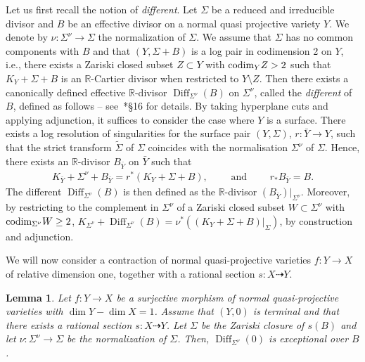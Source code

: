 \documentclass[11pt]{ip-journal}
\newtheorem{lemma}[theorem]{Lemma}
\theoremstyle{definition}
\DeclareMathOperator{\diff}{\mathrm{Diff}}
\newcommand{\bR}{\mathbb{R}}
\begin{document}
Let us first recall the notion of {\it different}.
Let $\Sigma$ be a reduced and irreducible divisor and $B$ be an effective divisor on a normal quasi projective variety $Y$.
We denote by $\nu \colon \Sigma^\nu \to \Sigma$ the normalization of $\Sigma$.
We assume that $\Sigma$ has no common components with $B$ and that $(Y, \Sigma+B)$ is a log pair in codimension 2 on $Y$, i.e., there exists a Zariski closed subset $Z \subset Y$ with ${\rm codim}_Y Z >2$ such that $K_Y+\Sigma+B$ is an $\mathbb R$-Cartier divisor when restricted to $Y \setminus Z$.
Then there exists a canonically defined effective $\mathbb{R}$-divisor $\diff_{\Sigma^\nu}(B)$ on $\Sigma^\nu$, called the \textit{different} of $B$, defined as follows -- see~\cite{MR1225842}*{\S 16} for details.
By taking hyperplane cuts and applying adjunction, it suffices to consider the case where $Y$ is a surface.
There exists a log resolution of singularities for the surface pair $(Y, \Sigma)$, $r \colon \bar{Y} \to Y$, such that the strict transform $\tilde{\Sigma}$ of $\Sigma$ coincides with the normalisation $\Sigma^\nu$ of $\Sigma$.
Hence, there exists an $\bR$-divisor $B_{\bar{Y}}$ on $\bar{Y}$ such that 
\begin{align*}
K_{\bar{Y}}+\Sigma^\nu+ B_{\bar{Y}} = r^\ast(K_Y+\Sigma+B), 
\qquad
\text{ and } 
\qquad
r_\ast B_{\bar{Y}} =B. 
\end{align*}
The different $\diff_{\Sigma^\nu}(B)$ is then defined as the $\bR$-divisor $(B_{\bar{Y}}) |_{\Sigma^\nu}$.
Moreover, by restricting to the complement in $\Sigma^{\nu}$ of a Zariski closed subset $W \subset \Sigma^\nu$ with ${\rm codim}_{\Sigma^\nu} W \geq 2$, 
$K_{\Sigma^\nu}+\diff_{\Sigma^\nu}(B)=\nu^*((K_Y+\Sigma+B) |_\Sigma)$, by construction and adjunction.

We will now consider a contraction of normal quasi-projective varieties 
$f \colon Y \to X$ 
of relative dimension one, together with a rational section 
$s \colon X \dashrightarrow Y$.

\begin{lemma}\label{section.lemma}
Let 
$f \colon Y \to X$ 
be a surjective morphism of normal quasi-projective varieties with 
$\dim Y -\dim X=1$.
Assume that 
$(Y, 0)$ 
is terminal and that there exists a rational section 
$s \colon X \dashrightarrow Y$.
Let 
$\Sigma$ 
be the Zariski closure of 
$s(B)$ 
and let 
$\nu\colon \Sigma^\nu \to \Sigma$ 
be the normalization of 
$\Sigma$. 
Then, 
$\diff_{\Sigma^\nu}(0)$ 
is exceptional over 
$B$.
\end{lemma}
\end{document}
